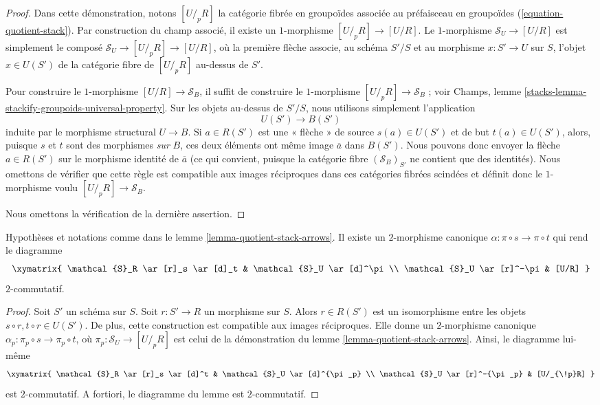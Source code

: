 \begin{proof}
Dans cette démonstration, notons $[U/_{\!p}R]$ la catégorie fibrée en groupoïdes associée au préfaisceau en groupoïdes (\ref{equation-quotient-stack}). Par construction du champ associé, il existe un $1$-morphisme $[U/_{\!p}R] \to [U/R]$. Le $1$-morphisme $\mathcal{S}_U \to [U/R]$ est simplement le composé $\mathcal{S}_U \to [U/_{\!p}R] \to [U/R]$, où la première flèche associe, au schéma $S'/S$ et au morphisme $x : S' \to U$ sur $S$, l'objet $x \in U(S')$ de la catégorie fibre de $[U/_{\!p}R]$ au-dessus de $S'$.

\medskip\noindent
Pour construire le $1$-morphisme $[U/R] \to \mathcal{S}_B$, il suffit de construire le $1$-morphisme $[U/_{\!p}R] \to \mathcal{S}_B$ ; voir Champs, lemme \ref{stacks-lemma-stackify-groupoids-universal-property}. Sur les objets au-dessus de $S'/S$, nous utilisons simplement l'application
$$
U(S') \longrightarrow B(S')
$$
induite par le morphisme structural $U \to B$. Si $a \in R(S')$ est une « flèche » de source $s(a) \in U(S')$ et de but $t(a) \in U(S')$, alors, puisque $s$ et $t$ sont des morphismes {\it sur} $B$, ces deux éléments ont même image $\overline{a}$ dans $B(S')$. Nous pouvons donc envoyer la flèche $a \in R(S')$ sur le morphisme identité de $\overline{a}$ (ce qui convient, puisque la catégorie fibre $(\mathcal{S}_B)_{S'}$ ne contient que des identités). Nous omettons de vérifier que cette règle est compatible aux images réciproques dans ces catégories fibrées scindées et définit donc le $1$-morphisme voulu $[U/_{\!p}R] \to \mathcal{S}_B$.

\medskip\noindent
Nous omettons la vérification de la dernière assertion.
\end{proof}

\begin{lemma}
\label{lemma-quotient-stack-2-arrow}
Hypothèses et notations comme dans le lemme \ref{lemma-quotient-stack-arrows}. Il existe un $2$-morphisme canonique $\alpha : \pi \circ s \to \pi \circ t$ qui rend le diagramme
$$
\xymatrix{
\mathcal{S}_R \ar[r]_s \ar[d]_t & \mathcal{S}_U \ar[d]^\pi \\
\mathcal{S}_U \ar[r]^-\pi & [U/R]
}
$$
$2$-commutatif.
\end{lemma}

\begin{proof}
Soit $S'$ un schéma sur $S$. Soit $r : S' \to R$ un morphisme sur $S$. Alors $r \in R(S')$ est un isomorphisme entre les objets $s \circ r, t \circ r \in U(S')$. De plus, cette construction est compatible aux images réciproques. Elle donne un $2$-morphisme canonique $\alpha_p : \pi_p \circ s \to \pi_p \circ t$, où $\pi_p : \mathcal{S}_U \to [U/_{\!p}R]$ est celui de la démonstration du lemme \ref{lemma-quotient-stack-arrows}. Ainsi, le diagramme lui-même
$$
\xymatrix{
\mathcal{S}_R \ar[r]_s \ar[d]^t & \mathcal{S}_U \ar[d]^{\pi_p} \\
\mathcal{S}_U \ar[r]^-{\pi_p} & [U/_{\!p}R]
}
$$
est $2$-commutatif. A fortiori, le diagramme du lemme est $2$-commutatif.
\end{proof}

